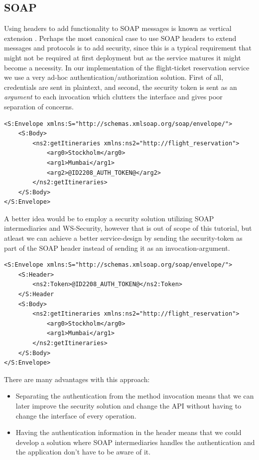 \documentclass[a4paper, 11pt]{article}
\begin{document}
\subsection*{SOAP}
Using headers to add functionality to SOAP messages is known as vertical extension \citep{coursebook}. Perhaps the most canonical case to use SOAP headers to extend messages and protocols is to add security, since this is a typical requirement that might not be required at first deployment but as the service matures it might become a necessity. In our implementation of the flight-ticket reservation service we use a very ad-hoc authentication/authorization solution. First of all, credentials are sent in plaintext, and second, the security token is sent as an \textit{argument} to each invocation which clutters the interface and gives poor separation of concerns.
\begin{lstlisting}[frame=single,style=base]
<S:Envelope xmlns:S="http://schemas.xmlsoap.org/soap/envelope/">
    <S:Body>
        <ns2:getItineraries xmlns:ns2="http://flight_reservation">
            <arg0>Stockholm</arg0>
            <arg1>Mumbai</arg1>
            <arg2>@ID2208_AUTH_TOKEN@</arg2>
        </ns2:getItineraries>
    </S:Body>
</S:Envelope>
\end{lstlisting}
A better idea would be to employ a security solution utilizing SOAP intermediaries and WS-Security, however that is out of scope of this tutorial, but atleast we can achieve a better service-design by sending the security-token as part of the SOAP header instead of sending it as an invocation-argument.
\begin{lstlisting}[frame=single,style=base]
<S:Envelope xmlns:S="http://schemas.xmlsoap.org/soap/envelope/">
    <S:Header>
        <ns2:Token>@ID2208_AUTH_TOKEN@</ns2:Token>
    </S:Header
    <S:Body>
        <ns2:getItineraries xmlns:ns2="http://flight_reservation">
            <arg0>Stockholm</arg0>
            <arg1>Mumbai</arg1>
        </ns2:getItineraries>
    </S:Body>
</S:Envelope>
\end{lstlisting}
There are many advantages with this approach:
\begin{itemize}
\item Separating the authentication from the method invocation means that we can later improve the security solution and change the API without having to change the interface of every operation.
\item Having the authentication information in the header means that we could develop a solution where SOAP intermediaries handles the authentication and the application don't have to be aware of it.
\end{itemize}
\end{document}

